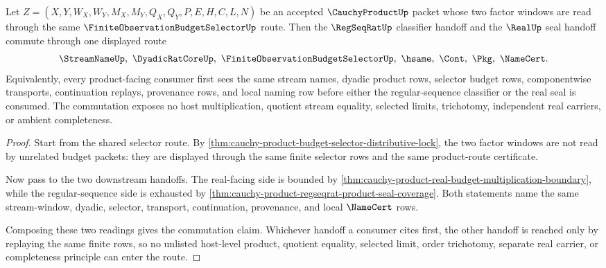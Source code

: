 \begin{theorem}
\label{thm:cauchy-product-shared-selector-regseqrat-real-seal-commutation}
Let $Z=(X,Y,W_X,W_Y,M_X,M_Y,Q_X,Q_Y,P,E,H,C,L,N)$ be an accepted $\CauchyProductUp$ packet whose two factor windows are read through the same $\FiniteObservationBudgetSelectorUp$ route. Then the $\RegSeqRatUp$ classifier handoff and the $\RealUp$ seal handoff commute through one displayed route
$$
\StreamNameUp,\ \DyadicRatCoreUp,\ \FiniteObservationBudgetSelectorUp,\ \hsame,\ \Cont,\ \Pkg,\ \NameCert.
$$
Equivalently, every product-facing consumer first sees the same stream names, dyadic product rows, selector budget rows, componentwise transports, continuation replays, provenance rows, and local naming row before either the regular-sequence classifier or the real seal is consumed. The commutation exposes no host multiplication, quotient stream equality, selected limits, trichotomy, independent real carriers, or ambient completeness.
\end{theorem}
\begin{proof}
Start from the shared selector route. By \autoref{thm:cauchy-product-budget-selector-distributive-lock}, the two factor windows are not read by unrelated budget packets: they are displayed through the same finite selector rows and the same product-route certificate.

Now pass to the two downstream handoffs. The real-facing side is bounded by \autoref{thm:cauchy-product-real-budget-multiplication-boundary}, while the regular-sequence side is exhausted by \autoref{thm:cauchy-product-regseqrat-product-seal-coverage}. Both statements name the same stream-window, dyadic, selector, transport, continuation, provenance, and local $\NameCert$ rows.

Composing these two readings gives the commutation claim. Whichever handoff a consumer cites first, the other handoff is reached only by replaying the same finite rows, so no unlisted host-level product, quotient equality, selected limit, order trichotomy, separate real carrier, or completeness principle can enter the route.
\end{proof}

